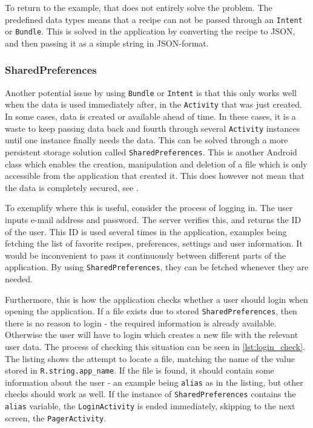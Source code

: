 To return to the example, that does not entirely solve the problem. The predefined data types means that a recipe can not be passed through an \texttt{Intent} or \texttt{Bundle}. This is solved in the application by converting the recipe to JSON, and then passing it as a simple string in JSON-format.

\subsubsection{SharedPreferences}
\label{subsubsec:sharedpreferences}

Another potential issue by using \texttt{Bundle} or \texttt{Intent} is that this only works well when the data is used immediately after, in the \texttt{Activity} that was just created. In some cases, data is created or available ahead of time. In these cases, it is a waste to keep passing data back and fourth through several \texttt{Activity} instances until one instance finally needs the data. This can be solved through a more persistent storage solution called \texttt{SharedPreferences}. This is another Android class which enables the creation, manipulation and deletion of a file which is only accessible from the application that created it\cite{sharedpreferences}. This does however not mean that the data is completely secured, see \citep{sharedpreferences_security}.

To exemplify where this is useful, consider the process of logging in. The user inputs e-mail address and password. The server verifies this, and returns the ID of the user. This ID is used several times in the application, examples being fetching the list of favorite recipes, preferences, settings and user information. It would be inconvenient to pass it continuously between different parts of the application. By using \texttt{SharedPreferences}, they can be fetched whenever they are needed.

Furthermore, this is how the application checks whether a user should login when opening the application. If a file exists due to stored \texttt{SharedPreferences}, then there is no reason to login - the required information is already available. Otherwise the user will have to login which creates a new file with the relevant user data. The process of checking this situation can be seen in \ref{lst:login_check}. The listing shows the attempt to locate a file, matching the name of the value stored in \texttt{R.string.app\_name}. If the file is found, it should contain some information about the user - an example being \texttt{alias} as in the listing, but other checks should work as well. If the instance of \texttt{SharedPreferences} contains the \texttt{alias} variable, the \texttt{LoginActivity} is ended immediately, skipping to the next screen, the \texttt{PagerActivity}.

